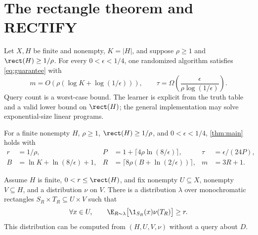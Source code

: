 \section{The rectangle theorem and RECTIFY}\label{sec:rectangle}
\begin{theorem}\label{thm:main}
Let $X,H$ be finite and nonempty, $K=|H|$, and suppose $\rho\ge1$ and $\rect(H)\ge1/\rho$. For every $0<\epsilon<1/4$, one randomized algorithm satisfies \eqref{eq:guarantee} with
\[
 m=O\!\left(\rho(\log K+\log(1/\epsilon))\right),\qquad
 \tau=\Omega\!\left(\frac{\epsilon}{\rho\log(1/\epsilon)}\right).
\]
Query count is a worst-case bound. The learner is explicit from the truth table and a valid lower bound on $\rect(H)$; the general implementation may solve exponential-size linear programs.
\end{theorem}
\begin{lemma}\label{lem:params}
For a finite nonempty $H$, $\rho\ge1$, $\rect(H)\ge1/\rho$, and $0<\epsilon<1/4$, \cref{thm:main} holds with
\begin{align}
 r&=1/\rho,&P&=1+\lceil4\rho\ln(8/\epsilon)\rceil,&\tau&=\epsilon/(24P),\label{eq:params1}\\
 B&=\ln K+\ln(8/\epsilon)+1,&R&=\lceil8\rho(B+\ln(2/\epsilon))\rceil,&m&=3R+1.\label{eq:params2}
\end{align}
\end{lemma}
\begin{lemma}\label{lem:mixture}
Assume $H$ is finite, $0<r\le\rect(H)$, and fix nonempty $U\subseteq X$, nonempty $V\subseteq H$, and a distribution $\nu$ on $V$. There is a distribution $\lambda$ over monochromatic rectangles $S_R\times T_R\subseteq U\times V$ such that
\begin{equation}\label{eq:coverage}
 \forall x\in U,\qquad
 \E_{R\sim\lambda}\bigl[\1_{S_R}(x)\nu(T_R)\bigr]\ge r.
\end{equation}
This distribution can be computed from $(H,U,V,\nu)$ without a query about $D$.
\end{lemma}

